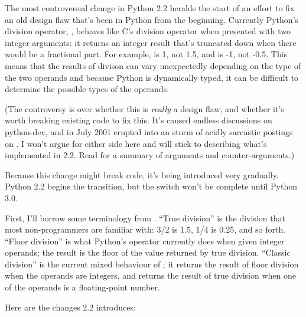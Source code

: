 \documentclass{howto}
\begin{document}
The most controversial change in Python 2.2 heralds the start of an effort
to fix an old design flaw that's been in Python from the beginning.
Currently Python's division operator, \code{/}, behaves like C's
division operator when presented with two integer arguments: it
returns an integer result that's truncated down when there would be
a fractional part.  For example,  is 1, not 1.5, and
 is -1, not -0.5.  This means that the results of divison
can vary unexpectedly depending on the type of the two operands and
because Python is dynamically typed, it can be difficult to determine
the possible types of the operands.

(The controversy is over whether this is \emph{really} a design flaw,
and whether it's worth breaking existing code to fix this.  It's
caused endless discussions on python-dev, and in July 2001 erupted into an
storm of acidly sarcastic postings on . I
won't argue for either side here and will stick to describing what's 
implemented in 2.2.  Read  for a summary of arguments and
counter-arguments.)  

Because this change might break code, it's being introduced very
gradually.  Python 2.2 begins the transition, but the switch won't be
complete until Python 3.0.

First, I'll borrow some terminology from .  ``True division'' is the
division that most non-programmers are familiar with: 3/2 is 1.5, 1/4
is 0.25, and so forth.  ``Floor division'' is what Python's \code{/}
operator currently does when given integer operands; the result is the
floor of the value returned by true division.  ``Classic division'' is
the current mixed behaviour of \code{/}; it returns the result of
floor division when the operands are integers, and returns the result
of true division when one of the operands is a floating-point number.

Here are the changes 2.2 introduces:
\end{document}
